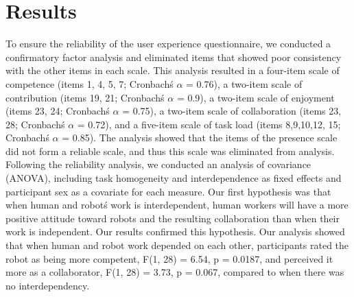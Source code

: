 \section{Results}
       To ensure the reliability of the user experience questionnaire, we conducted a confirmatory factor analysis and eliminated items that showed poor consistency with the other items in each scale. This analysis resulted in a four-item scale of competence (items 1, 4, 5, 7; Cronbach\' s $\alpha$ = 0.76), a two-item scale of contribution (items 19, 21; Cronbach\' s $\alpha$ = 0.9), a two-item scale of enjoyment (items 23, 24; Cronbach\' s $\alpha$ = 0.75),  a two-item scale of collaboration (items 23, 28; Cronbach\' s $\alpha$ = 0.72), and a five-item scale of task load (items 8,9,10,12, 15; Cronbach\' s $\alpha$ = 0.85). The analysis showed that the items of the presence scale did not form a reliable scale, and thus this scale was eliminated from analysis.\\
       Following the reliability analysis, we conducted an analysis of covariance (ANOVA), including task homogeneity and interdependence as fixed effects and participant sex as a covariate for each measure. Our first hypothesis was that when human and robot\' s work is interdependent, human workers will have a more positive attitude toward robots and the resulting collaboration than when their work is independent. Our results confirmed this hypothesis. Our  analysis showed that when human and robot work depended on each other, participants rated the robot as being more competent, F(1, 28) = 6.54, p = 0.0187, and perceived it more as a collaborator, F(1, 28) = 3.73, p = 0.067, compared to when there was no interdependency. 

